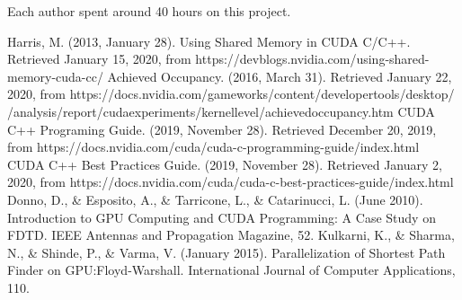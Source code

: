 \documentclass[conference]{IEEEtran}
\begin{document}
Each author spent around 40 hours on this project.



\begin{thebibliography}{00}
	 Harris, M. (2013, January 28). Using Shared Memory in CUDA C/C++. Retrieved January 15, 2020, from https://devblogs.nvidia.com/using-shared-memory-cuda-cc/
	 Achieved Occupancy. (2016, March 31). Retrieved January 22, 2020, from https://docs.nvidia.com/gameworks/content/developertools/desktop/
	/analysis/report/cudaexperiments/kernellevel/achievedoccupancy.htm
	 CUDA C++ Programing Guide. (2019, November 28). Retrieved December 20, 2019, from https://docs.nvidia.com/cuda/cuda-c-programming-guide/index.html
	 CUDA C++ Best Practices Guide. (2019, November 28). Retrieved January 2, 2020, from https://docs.nvidia.com/cuda/cuda-c-best-practices-guide/index.html
	 Donno, D., \& Esposito, A., \& Tarricone, L., \& Catarinucci, L. (June 2010). Introduction to GPU Computing and CUDA Programming: A Case Study on FDTD. IEEE Antennas and Propagation Magazine, 52.  
	 Kulkarni, K., \& Sharma, N., \& Shinde, P., \& Varma, V. (January 2015). Parallelization of Shortest Path Finder on GPU:Floyd-Warshall. International Journal of Computer Applications, 110. 
\end{thebibliography}
\end{document}
